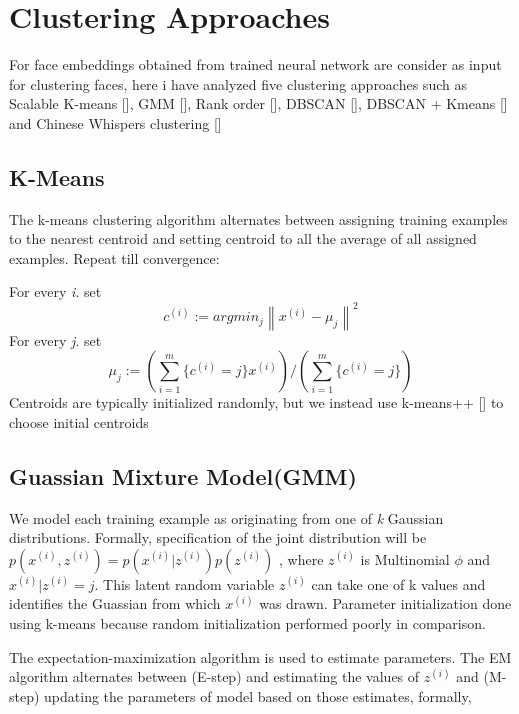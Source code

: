 \documentclass[a4paper,12pt, twoside]{NITKReport}
\begin{document}
\section{Clustering Approaches}
For face embeddings obtained from trained neural network are consider as input for clustering faces, here i have analyzed five clustering approaches such as Scalable K-means [\cite{bahmani2012scalable}], GMM [\cite{cui2007easyalbum}], Rank order [\cite{ho2003clustering}], DBSCAN [\cite{schroff2015facenet}], DBSCAN + Kmeans [\cite{tian2007face}] and Chinese Whispers clustering [\cite{biemann2006chinese}]

\subsection{K-Means}
\par The k-means clustering algorithm alternates between assigning training examples to the nearest centroid and setting centroid to all the average of all assigned examples. Repeat till convergence:

For every \textit{i}. set
\begin{equation}
c^{(i)} := argmin_{j}\left \| x^{(i)} - \mu _{j} \right \|^{2}
\end{equation}
For every \textit{j}. set
\begin{equation}
\mu _{j} := (\sum_{i=1}^{m} \{ c^{(i)}=j \}x^{(i)})/(\sum_{i=1}^{m} \{ c^{(i)}=j \})
\end{equation}
Centroids are typically initialized randomly, but we instead use k-means++ [\cite{bahmani2012scalable}] to choose initial centroids

\subsection{Guassian Mixture Model(GMM)}
\par We model each training example as originating from one of \textit{k} Gaussian  distributions. Formally, specification of the joint distribution will be $p(x^{(i)},z^{(i)}) = p(x^{(i)}|z^{(i)})p(z^{(i)})$ , where $z^{(i)}$ is Multinomial $\phi$ and $x^{(i)}|z^{(i)} = j$. This latent random variable $z^{(i)}$ can take one of k values and identifies the Guassian from which $x^{(i)}$ was drawn. Parameter initialization done using k-means because random initialization performed poorly in comparison. 

The expectation-maximization algorithm is used to estimate parameters. The EM algorithm alternates between (E-step) and estimating the values of $z^{(i)}$ and (M-step) updating the parameters of model based on those estimates, formally,
\end{document}
